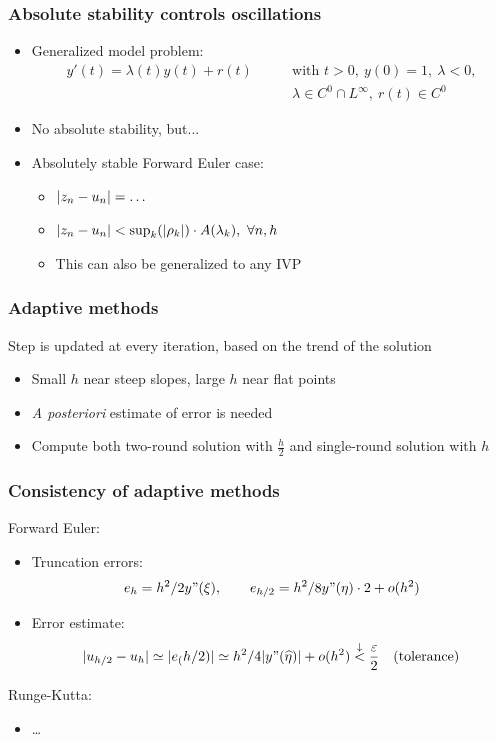 \documentclass{beamer}
\begin{document}
\begin{frame} %
\frametitle{Absolute stability controls oscillations}
\begin{itemize}
	\item Generalized model problem:
	\begin{align*}
		y'(t) = \lambda(t) y(t) + r(t) \qquad & \text{with } t > 0,
		\ y(0) = 1, \ \lambda < 0,  \\
		& \lambda \in C^0 \cap L^\infty, \ r(t) \in C^0
	\end{align*}
	\item No absolute stability, but...
	\item Absolutely stable Forward Euler case:
	\begin{itemize}
		\item $\lvert z_n - u_n\rvert = \dots$ %
		\item $\lvert z_n - u_n\rvert < \sup_k(\lvert\rho_k\rvert) \cdot A(\lambda_k), \ \forall n,h$ %
		\item This can also be generalized to any IVP
	\end{itemize}
\end{itemize}
\end{frame}


\begin{frame} %
	\frametitle{Adaptive methods}
	Step is updated at every iteration, based on the trend of the solution
	\begin{itemize}
		\item Small $h$ near steep slopes, large $h$ near flat points %
		\item \textit{A posteriori} estimate of error is needed
		\item Compute both two-round solution with $\frac{h}{2}$ and single-round solution with $h$
	\end{itemize}
\end{frame}

\begin{frame} %
	\frametitle{Consistency of adaptive methods}
	Forward Euler:
	\begin{itemize}
		\item Truncation errors:
		$$ e_h = h^2/2 y"(\xi), \qquad e_{h/2} = h^2/8 y"(\eta) \cdot 2 + o(h^2) $$
		\item Error estimate:
		$$ \lvert u_{h/2} - u_h\rvert \simeq \lvert e_(h/2)\rvert \simeq h^2/4 \lvert y"(\widehat\eta)\rvert
		+ o(h^2) \stackrel{\downarrow}{<} \frac{\varepsilon}{2}
		\quad \text{(tolerance)} $$
	\end{itemize}
	Runge-Kutta:
	\begin{itemize}
		\item \dots %
	\end{itemize}
\end{frame}
\end{document}
